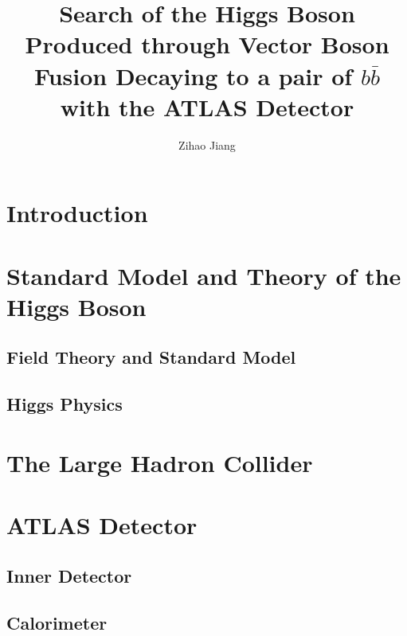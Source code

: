 \documentclass{report}
\begin{document}
\title{ Search of the Higgs Boson Produced through Vector Boson Fusion Decaying to a pair of $b \bar{b}$ with the ATLAS Detector}
\author{Zihao Jiang}

\beforepreface
{}




\afterpreface

\chapter{Introduction}
\label{chap:intro}


\chapter{Standard Model and Theory of the Higgs Boson}
\label{chap:theory}


\section{Field Theory and Standard Model}


\section{Higgs Physics}



\chapter{The Large Hadron Collider}
\label{chap:collider}

\clearpage

\chapter{ATLAS Detector}
\label{chap:detector}


\section{Inner Detector}


\section{Calorimeter}

\end{document}
